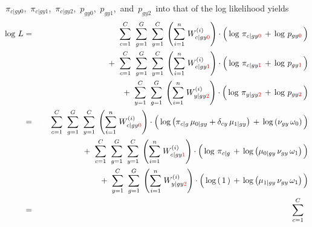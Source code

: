 \,$\pi_{c \vert gy0}$,
\,$\pi_{c \vert gy1}$,
\,$\pi_{c \vert gy2}$,
\,$p_{gy0}$,
\,$p_{gy1}$,
\,and
\,$p_{gy2}$
\,into that of the log likelihood yields
\begin{eqnarray*}
\log\,L
&=&
	{\color{white}+} \;\;
	\overset{C}{\underset{c=1}{\sum}}\;\;
	\overset{G}{\underset{g=1}{\sum}}\;\;
	\overset{C}{\underset{y=1}{\sum}}\;
	\left(\overset{n}{\underset{i=1}{\sum}}\;W^{(i)}_{c \vert gy{\color{red}0}}\right)
	\cdot
	\left(\,
		\log\,\pi_{c \vert gy\color{red}0} \,\overset{{\color{white}.}}{+}\, \log\,p_{gy\color{red}0}
	\,\right)
\\
&&
	+ \;\;
	\overset{C}{\underset{c=1}{\sum}}\;\;
	\overset{G}{\underset{g=1}{\sum}}\;\;
	\overset{C}{\underset{y=1}{\sum}}\;
	\left(\overset{n}{\underset{i=1}{\sum}}\;W^{(i)}_{c \vert gy{\color{red}1}}\right)
	\cdot
	\left(\,
		\log\,\pi_{c \vert gy\color{red}1} \,\overset{{\color{white}.}}{+}\, \log\,p_{gy\color{red}1}
	\,\right)
\\
&&
	+ \;\;
	\overset{C}{\underset{y=1}{\sum}}\;\;
	\overset{G}{\underset{g=1}{\sum}}\;
	\left(\overset{n}{\underset{i=1}{\sum}}\;W^{(i)}_{y \vert gy{\color{red}2}}\right)
	\cdot
	\left(\,
		\log\,\pi_{y \vert gy\color{red}2} \,\overset{{\color{white}.}}{+}\, \log\,p_{gy\color{red}2}
	\,\right)
\\
&=&
	{\color{white}+} \;\;
	\overset{C}{\underset{c=1}{\sum}}\;\;
	\overset{G}{\underset{g=1}{\sum}}\;\;
	\overset{C}{\underset{y=1}{\sum}}\;
	\left(\overset{n}{\underset{i=1}{\sum}}\;W^{(i)}_{c \vert gy{\color{red}0}}\right)
	\cdot
	\left(\,
		\log\left(\pi_{c \vert g}\,\mu_{0 \vert gy} + \delta_{cy}\,\mu_{1\vert gy}\right)
		\,\overset{{\color{white}.}}{+}\,
		\log\left(\nu_{gy}\,\omega_{0}\right)
	\,\right)
\\
&&
	+ \;\;
	\overset{C}{\underset{c=1}{\sum}}\;\;
	\overset{G}{\underset{g=1}{\sum}}\;\;
	\overset{C}{\underset{y=1}{\sum}}\;
	\left(\overset{n}{\underset{i=1}{\sum}}\;W^{(i)}_{c \vert gy{\color{red}1}}\right)
	\cdot
	\left(\,
		\log\,\pi_{c \vert g}
		\,\overset{{\color{white}.}}{+}\,
		\log\left(\mu_{0\vert gy}\,\nu_{gy}\,\omega_{1}\right)
	\,\right)
\\
&&
	+ \;\;
	\overset{C}{\underset{y=1}{\sum}}\;\;
	\overset{G}{\underset{g=1}{\sum}}\;
	\left(\overset{n}{\underset{i=1}{\sum}}\;W^{(i)}_{y \vert gy{\color{red}2}}\right)
	\cdot
	\left(\,
		\log\left(\,1\,\right)
		\,\overset{{\color{white}.}}{+}\,
		\log\left(\mu_{1 \vert gy}\,\nu_{gy}\,\omega_{1}\right)
	\,\right)
\\
&=&
	{\color{white}+} \;\;
	\overset{C}{\underset{c=1}{\sum}}\;\;

\end{eqnarray*}

